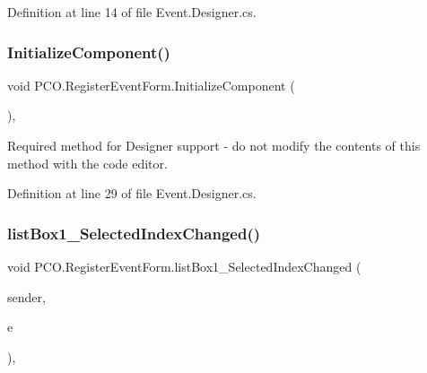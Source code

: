 Definition at line 14 of file Event.\+Designer.\+cs.

\mbox{\label{classPCO_1_1RegisterEventForm_a38a931585bbd31d0f4535a03d30b7b87}} 
\subsubsection{\texorpdfstring{Initialize\+Component()}{InitializeComponent()}}
{\footnotesize\ttfamily void P\+C\+O.\+Register\+Event\+Form.\+Initialize\+Component (\begin{DoxyParamCaption}{ }\end{DoxyParamCaption})\hspace{0.3cm}{\ttfamily [inline]}, {\ttfamily [private]}}



Required method for Designer support -\/ do not modify the contents of this method with the code editor. 



Definition at line 29 of file Event.\+Designer.\+cs.

\mbox{\label{classPCO_1_1RegisterEventForm_a8746a2d2cddf34bda5367b7df5ca58ca}} 
\subsubsection{\texorpdfstring{list\+Box1\+\_\+\+Selected\+Index\+Changed()}{listBox1\_SelectedIndexChanged()}}
{\footnotesize\ttfamily void P\+C\+O.\+Register\+Event\+Form.\+list\+Box1\+\_\+\+Selected\+Index\+Changed (\begin{DoxyParamCaption}\item[{object}]{sender,  }\item[{Event\+Args}]{e }\end{DoxyParamCaption})\hspace{0.3cm}{\ttfamily [inline]}, {\ttfamily [private]}}



